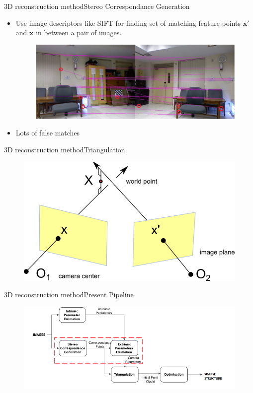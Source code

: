 \documentclass{beamer}
\begin{document}
\begin{frame}{3D reconstruction method}{Stereo Correspondance Generation}
  \begin{itemize}
    \item Use image descriptors like SIFT for finding set of matching feature points $\mathbf{x}'$ and $\mathbf{x}$ in between a pair of images.
  \begin{figure}[ht!]
    \centering
    \includegraphics[width=\linewidth]{siftcorres.jpg}
  \end{figure}
    \item Lots of false matches
  \end{itemize}
\end{frame}

\begin{frame}{3D reconstruction method}{Triangulation}
  \begin{figure}[ht!]
    \centering
    \includegraphics[width=0.6\linewidth]{triangulation.png}
  \end{figure}
\end{frame}

\begin{frame}{3D reconstruction method}{Present Pipeline}
  \begin{figure}[ht!]
    \centering
    \includegraphics[width=\linewidth]{traditional_paipeline.png}
  \end{figure}
\end{frame}
\end{document}
